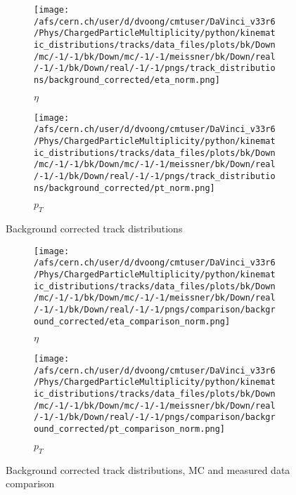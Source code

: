 \begin{figure}[h]
	\begin{subfigure}{0.49\textwidth}
		\texttt{[image: /afs/cern.ch/user/d/dvoong/cmtuser/DaVinci\_v33r6/Phys/ChargedParticleMultiplicity/python/kinematic\_distributions/tracks/data\_files/plots/bk/Down/mc/-1/-1/bk/Down/mc/-1/-1/meissner/bk/Down/real/-1/-1/bk/Down/real/-1/-1/pngs/track\_distributions/background\_corrected/eta\_norm.png]}
		\caption{$\eta$}
		\label{fig: background corrected track distributions eta}
	\end{subfigure}
	\begin{subfigure}[h]{0.49\textwidth}
		\texttt{[image: /afs/cern.ch/user/d/dvoong/cmtuser/DaVinci\_v33r6/Phys/ChargedParticleMultiplicity/python/kinematic\_distributions/tracks/data\_files/plots/bk/Down/mc/-1/-1/bk/Down/mc/-1/-1/meissner/bk/Down/real/-1/-1/bk/Down/real/-1/-1/pngs/track\_distributions/background\_corrected/pt\_norm.png]}
		\caption{$p_T$}
		\label{fig: background corrected track distributions pt}
	\end{subfigure}
	\caption{Background corrected track distributions}
	\label{fig: background corrected track distributions}
\end{figure}

\begin{figure}[h]
	\begin{subfigure}{0.49\textwidth}
		\texttt{[image: /afs/cern.ch/user/d/dvoong/cmtuser/DaVinci\_v33r6/Phys/ChargedParticleMultiplicity/python/kinematic\_distributions/tracks/data\_files/plots/bk/Down/mc/-1/-1/bk/Down/mc/-1/-1/meissner/bk/Down/real/-1/-1/bk/Down/real/-1/-1/pngs/comparison/background\_corrected/eta\_comparison\_norm.png]}
		\caption{$\eta$}
		\label{fig: background corrected track distributions eta}
	\end{subfigure}
	\begin{subfigure}{0.49\textwidth}
		\texttt{[image: /afs/cern.ch/user/d/dvoong/cmtuser/DaVinci\_v33r6/Phys/ChargedParticleMultiplicity/python/kinematic\_distributions/tracks/data\_files/plots/bk/Down/mc/-1/-1/bk/Down/mc/-1/-1/meissner/bk/Down/real/-1/-1/bk/Down/real/-1/-1/pngs/comparison/background\_corrected/pt\_comparison\_norm.png]}
		\caption{$p_T$}
		\label{fig: background corrected track distributions pt}
	\end{subfigure}
	\caption{Background corrected track distributions, MC and measured data comparison}
	\label{fig: background corrected track distributions, MC and measured data comparison}
\end{figure}

